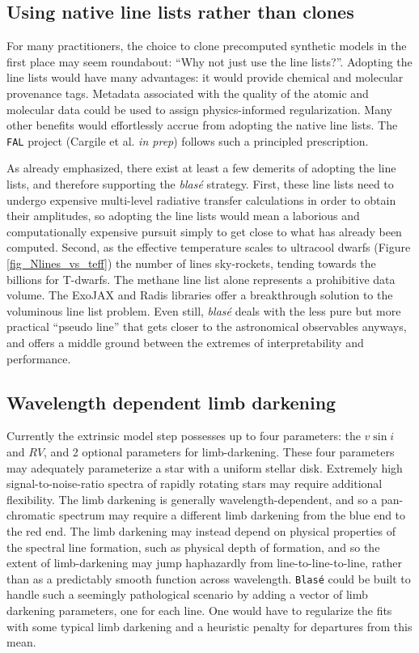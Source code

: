 \documentclass[trackchanges]{aastex631}
\begin{document}
\subsection{Using native line lists rather than clones}
For many practitioners, the choice to clone precomputed synthetic models in the first place may seem roundabout: ``Why not just use the line lists?''.  Adopting the line lists would have many advantages: it would provide chemical and molecular provenance tags.  Metadata associated with the quality of the atomic and molecular data could be used to assign physics-informed regularization.  Many other benefits would effortlessly accrue from adopting the native line lists.  The \texttt{FAL} project (Cargile et al. \emph{in prep}) follows such a principled prescription.

As already emphasized, there exist at least a few demerits of adopting the line lists, and therefore supporting the \emph{blas\'e} strategy.  First, these line lists need to undergo expensive multi-level radiative transfer calculations in order to obtain their amplitudes, so adopting the line lists would mean a laborious and computationally expensive pursuit simply to get close to what has already been computed.  Second, as the effective temperature scales to ultracool dwarfs (Figure \ref{fig_Nlines_vs_teff}) the number of lines sky-rockets, tending towards the billions for T-dwarfs.  The methane line list alone \citep{2020ApJS..247...55H} represents a prohibitive data volume.  The ExoJAX and Radis \citep{2019JQSRT.222...12P,2021JQSRT.26107476V} libraries offer a breakthrough solution to the voluminous line list problem.  Even still,  \emph{blas\'e} deals with the less pure but more practical ``pseudo line'' that gets closer to the astronomical observables anyways, and offers a middle ground between the extremes of interpretability and performance.

\subsection{Wavelength dependent limb darkening}
Currently the extrinsic model step possesses up to four parameters: the $v\sin{i}$ and $RV$, and 2 optional parameters for limb-darkening.  These four parameters may adequately parameterize a star with a uniform stellar disk.  Extremely high signal-to-noise-ratio spectra of rapidly rotating stars may require additional flexibility.  The limb darkening is generally wavelength-dependent, and so a pan-chromatic spectrum may require a different limb darkening from the blue end to the red end.  The limb darkening may instead depend on physical properties of the spectral line formation, such as physical depth of formation, and so the extent of limb-darkening may jump haphazardly from line-to-line-to-line, rather than as a predictably smooth function across wavelength.  \texttt{Blas\'e} could be built to handle such a seemingly pathological scenario by adding a vector of limb darkening parameters, one for each line.  One would have to regularize the fits with some typical limb darkening and a heuristic penalty for departures from this mean.
\end{document}
